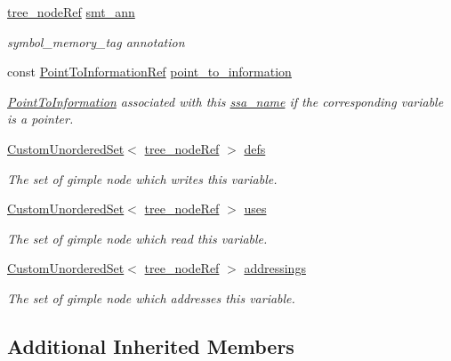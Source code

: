 \begin{DoxyCompactItemize}
\hyperlink{tree__node_8hpp_a6ee377554d1c4871ad66a337eaa67fd5}{tree\+\_\+node\+Ref} \hyperlink{structvar__decl_a4306d64ca0058b391f6b04da32508069}{smt\+\_\+ann}
\begin{DoxyCompactList}\small\item\em symbol\+\_\+memory\+\_\+tag annotation \end{DoxyCompactList}\item 
const \hyperlink{tree__node_8hpp_aa7470417b67a13b20fb980e600e55d8d}{Point\+To\+Information\+Ref} \hyperlink{structvar__decl_a1a9d73d52836a861625c3562ca95bcfa}{point\+\_\+to\+\_\+information}
\begin{DoxyCompactList}\small\item\em \hyperlink{structPointToInformation}{Point\+To\+Information} associated with this \hyperlink{structssa__name}{ssa\+\_\+name} if the corresponding variable is a pointer. \end{DoxyCompactList}\item 
\hyperlink{classCustomUnorderedSet}{Custom\+Unordered\+Set}$<$ \hyperlink{tree__node_8hpp_a6ee377554d1c4871ad66a337eaa67fd5}{tree\+\_\+node\+Ref} $>$ \hyperlink{structvar__decl_a6de7749876cdf8345f0290f8105084ea}{defs}
\begin{DoxyCompactList}\small\item\em The set of gimple node which writes this variable. \end{DoxyCompactList}\item 
\hyperlink{classCustomUnorderedSet}{Custom\+Unordered\+Set}$<$ \hyperlink{tree__node_8hpp_a6ee377554d1c4871ad66a337eaa67fd5}{tree\+\_\+node\+Ref} $>$ \hyperlink{structvar__decl_ad7f95855a9455bc23f36841fb4d83daa}{uses}
\begin{DoxyCompactList}\small\item\em The set of gimple node which read this variable. \end{DoxyCompactList}\item 
\hyperlink{classCustomUnorderedSet}{Custom\+Unordered\+Set}$<$ \hyperlink{tree__node_8hpp_a6ee377554d1c4871ad66a337eaa67fd5}{tree\+\_\+node\+Ref} $>$ \hyperlink{structvar__decl_aad131efeb073923ab8445dc89e6536fb}{addressings}
\begin{DoxyCompactList}\small\item\em The set of gimple node which addresses this variable. \end{DoxyCompactList}\end{DoxyCompactItemize}
\subsection*{Additional Inherited Members}



